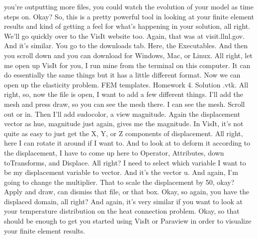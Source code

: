 \documentclass[10pt]{article}
\begin{document}
{you're outputting more files, you could watch the evolution of your model as time steps on. Okay? So, this is a pretty powerful tool in looking at your finite element results and kind of getting a feel for what's happening in your solution, all right. We'll go quickly over to the VisIt website too. Again, that was at visit.llnl.gov. And it's similar. You go to the downloads tab. Here, the Executables. And then you scroll down and you can download for Windows, Mac, or Linux. All right, let me open up VisIt for you, I run mine from the terminal on this computer. It can do essentially the same things but it has a little different format. Now we can open up the elasticity problem. FEM templates. Homework 4. Solution .vtk. All right, so, now the file is open, I want to add a few different things. I'll add the mesh and press draw, so you can see the mesh there. I can see the mesh. Scroll out or in. Then I'll add sudocolor, a view magnitude. Again the displacement vector as hue, magnitude just again, gives me the magnitude. In VisIt, it's not quite as easy to just get the X, Y, or Z components of displacement. All right, here I can rotate it around if I want to. And to look at to deform it according to the displacement, I have to come up here to Operator, Attributes, down toTransforms, and Displace. All right? I need to select which variable I want to be my displacement variable to vector. And it's the vector u. And again, I'm going to change the multiplier. That to scale the displacement by 50, okay? Apply and draw, can dismiss that file, or that box. Okay, so again, you have the displaced domain, all right? And again, it's very similar if you want to look at your temperature distribution on the heat connection problem. Okay, so that should be enough to get you started using VisIt or Paraview in order to visualize your finite element results.

}
\end{document}
